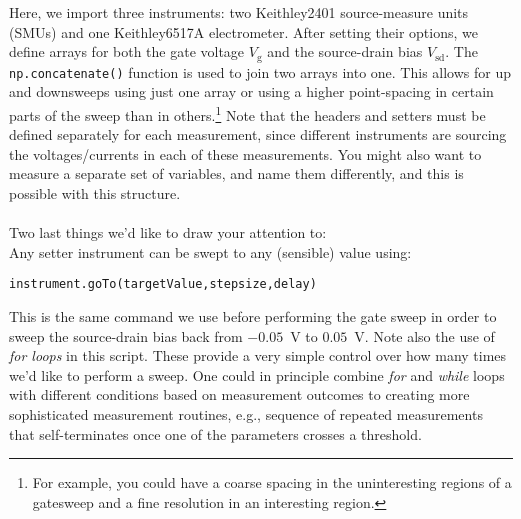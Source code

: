 Here, we import three instruments: two Keithley2401 source-measure units (SMUs) and one Keithley6517A electrometer. After setting their options, we define arrays for both the gate voltage $V_{\mathrm{g}}$ and the source-drain bias $V_{\mathrm{sd}}$. The \texttt{np.concatenate()} function is used to join two arrays into one. This allows for up and downsweeps using just one array or using a higher point-spacing in certain parts of the sweep than in others.\footnote{For example, you could have a coarse spacing in the uninteresting regions of a gatesweep and a fine resolution in an interesting region.} Note that the headers and setters must be defined separately for each measurement, since different instruments are sourcing the voltages/currents in each of these measurements. You might also want to measure a separate set of variables, and name them differently, and this is possible with this structure.\\
\\
Two last things we'd like to draw your attention to:\\
Any setter instrument can be swept to any (sensible) value using:\\

\begin{verbatim}
instrument.goTo(targetValue,stepsize,delay)
\end{verbatim}

This is the same command we use before performing the gate sweep in order to sweep the source-drain bias back from $-0.05$~V to $0.05$~V. Note also the use of \textit{for loops} in this script. These provide a very simple control over how many times we'd like to perform a sweep. One could in principle combine \textit{for} and \textit{while} loops with different conditions based on measurement outcomes to creating more sophisticated measurement routines, e.g., sequence of repeated measurements that self-terminates once one of the parameters crosses a threshold.\\



